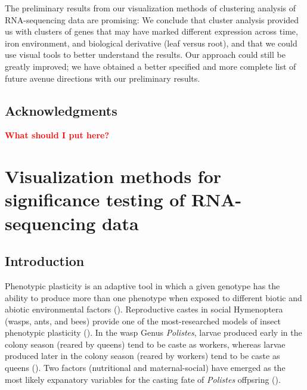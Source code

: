 \documentclass[11pt,a4paper,oldfontcommands,openany]{memoir}
\numberwithin{equation}{section} %
\begin{document}
The preliminary results from our visualization methods of clustering analysis of RNA-sequencing data are promising: We conclude that cluster analysis provided us with clusters of genes that may have marked different expression across time, iron environment, and biological derivative (leaf versus root), and that we could use visual tools to better understand the results. Our approach could still be greatly improved; we have obtained a better specified and more complete list of future avenue directions with our preliminary results. 

\section{Acknowledgments}

\textbf{\textcolor{Red}{What should I put here?}}







\chapter{Visualization methods for significance testing of RNA-sequencing data}

\section{Introduction}

Phenotypic plasticity is an adaptive tool in which a given genotype has the ability to produce more than one phenotype when exposed to different biotic and abiotic environmental factors (\citealt{pw4}). Reproductive castes in social Hymenoptera (wasps, ants, and bees) provide one of the most-researched models of insect phenotypic plasticity (\citealt{pw5}). In the wasp Genus \textit{Polistes}, larvae produced early in the colony season (reared by queens) tend to be caste as workers, whereas larvae produced later in the colony season (reared by workers) tend to be caste as queens (\citealt{pw3}). Two factors (nutritional and maternal-social) have emerged as the most likely expanatory variables for the casting fate of \textit{Polistes} offpsring (\citealt{pw3}).
\end{document}
